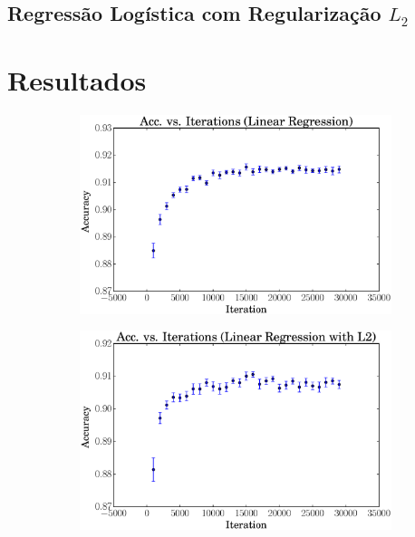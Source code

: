 \documentclass[a4paper, 12pt]{article}
\begin{document}
\subsection{Regressão Logística com Regularização $L_2$}

\section{Resultados}

\begin{figure}[htpb]
    \centering
    \begin{subfigure}[htpb]{0.45\textwidth}
        \includegraphics[width=\textwidth]{acc_vs_iterations_linreg}
        \caption{}
        \label{fig:it_linreg}
    \end{subfigure}
    \begin{subfigure}[htpb]{0.45\textwidth}
        \includegraphics[width=\textwidth]{acc_vs_iterations_linregL2}

\end{subfigure}
\end{figure}
\end{document}
